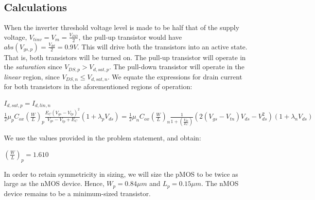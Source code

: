 \documentclass[10pt,a4paper]{article}
\begin{document}
\subsection{Calculations}
\noindent When the inverter threshold voltage level is made to be half that of the supply voltage, $V_{tinv} = V_{m} = \frac{V_{DD}}{2}$, the pull-up transistor would have $abs(V_{gs,p}) = \frac{V_{dd}}{2} = 0.9V$. This will drive both the transistors into an active state. That is, both transistors will be turned on. The pull-up transistor will operate in the \emph{saturation} since $V_{DS,p} > V_{d,sat,p}$. The pull-down transistor will operate in the \emph{linear} region, since $V_{DS,n} \leq V_{d,sat,n}$. We equate the expressions for drain current for both transistors in the aforementioned regions of operation:

\begin{center}
    $I_{d,sat,p} = I_{d,lin,n}$ \\
    $\frac{1}{2}\mu_{p}C_{ox}(\frac{W}{L})_{p}\frac{E_{C}(V_{gs}-V_{tp})^{2}}{V_{gs}-V_{tp}+E_{C}}(1+\lambda_{p} V_{ds}) = \frac{1}{2}\mu_{n}C_{ox}(\frac{W}{L})_{n}\frac{1}{1+(\frac{V_{ds}}{E_{C}})}(2(V_{gs}-V_{tn})V_{ds}-V_{ds}^2)(1+\lambda_{n} V_{ds})$
\end{center}

\noindent We use the values provided in the problem statement, and obtain:

\begin{center}
    $(\frac{W}{L})_{p} = 1.610$
\end{center}

\noindent In order to retain symmetricity in sizing, we will size the pMOS to be twice as large as the nMOS device. Hence, $W_p = 0.84 \mu m$ and $L_p = 0.15 \mu m$. The nMOS device remains to be a minimum-sized transistor.
\end{document}
